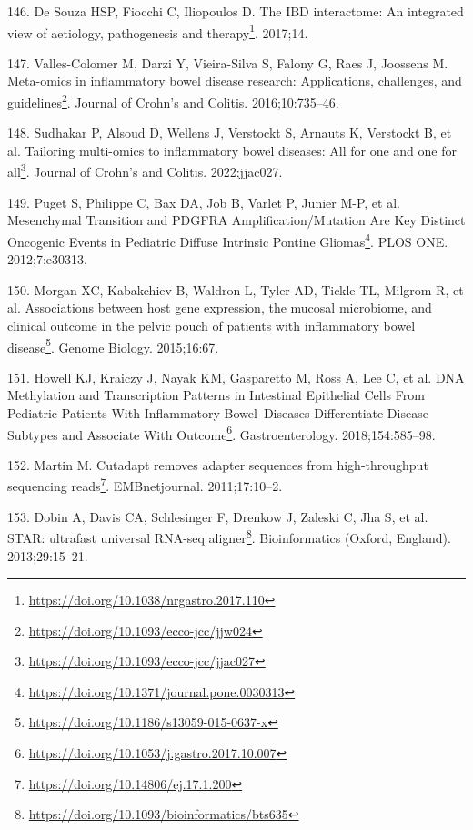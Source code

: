 \documentclass[
  a4paper,
]{book}
\DeclareRobustCommand{\href}[2]{#2\footnote{\url{#1}}}
\newlength{\cslhangindent}
\newlength{\cslentryspacingunit} %
\newenvironment{CSLReferences}[2] %
 {%
  \setlength{\parindent}{0pt}
  \ifodd #1
  \let\oldpar\par
  \def\par{\hangindent=\cslhangindent\oldpar}
  \fi
  \setlength{\parskip}{#2\cslentryspacingunit}
 }%
 {}
\begin{document}
\begin{CSLReferences}{0}{0}
\leavevmode{}%
146. De Souza HSP, Fiocchi C, Iliopoulos D. \href{https://doi.org/10.1038/nrgastro.2017.110}{The {IBD} interactome: {An} integrated view of aetiology, pathogenesis and therapy}. 2017;14.

\leavevmode{}%
147. Valles-Colomer M, Darzi Y, Vieira-Silva S, Falony G, Raes J, Joossens M. \href{https://doi.org/10.1093/ecco-jcc/jjw024}{Meta-omics in inflammatory bowel disease research: Applications, challenges, and guidelines}. Journal of Crohn's and Colitis. 2016;10:735--46.

\leavevmode{}%
148. Sudhakar P, Alsoud D, Wellens J, Verstockt S, Arnauts K, Verstockt B, et al. \href{https://doi.org/10.1093/ecco-jcc/jjac027}{Tailoring multi-omics to inflammatory bowel diseases: All for one and one for all}. Journal of Crohn's and Colitis. 2022;jjac027.

\leavevmode{}%
149. Puget S, Philippe C, Bax DA, Job B, Varlet P, Junier M-P, et al. \href{https://doi.org/10.1371/journal.pone.0030313}{Mesenchymal Transition and PDGFRA Amplification/Mutation Are Key Distinct Oncogenic Events in Pediatric Diffuse Intrinsic Pontine Gliomas}. PLOS ONE. 2012;7:e30313.

\leavevmode{}%
150. Morgan XC, Kabakchiev B, Waldron L, Tyler AD, Tickle TL, Milgrom R, et al. \href{https://doi.org/10.1186/s13059-015-0637-x}{Associations between host gene expression, the mucosal microbiome, and clinical outcome in the pelvic pouch of patients with inflammatory bowel disease}. Genome Biology. 2015;16:67.

\leavevmode{}%
151. Howell KJ, Kraiczy J, Nayak KM, Gasparetto M, Ross A, Lee C, et al. \href{https://doi.org/10.1053/j.gastro.2017.10.007}{DNA Methylation and Transcription Patterns in Intestinal Epithelial Cells From Pediatric Patients With Inflammatory Bowel~Diseases Differentiate Disease Subtypes and Associate With Outcome}. Gastroenterology. 2018;154:585--98.

\leavevmode{}%
152. Martin M. \href{https://doi.org/10.14806/ej.17.1.200}{Cutadapt removes adapter sequences from high-throughput sequencing reads}. EMBnetjournal. 2011;17:10--2.

\leavevmode{}%
153. Dobin A, Davis CA, Schlesinger F, Drenkow J, Zaleski C, Jha S, et al. \href{https://doi.org/10.1093/bioinformatics/bts635}{STAR: ultrafast universal RNA-seq aligner}. Bioinformatics (Oxford, England). 2013;29:15--21.


\end{CSLReferences}
\end{document}
